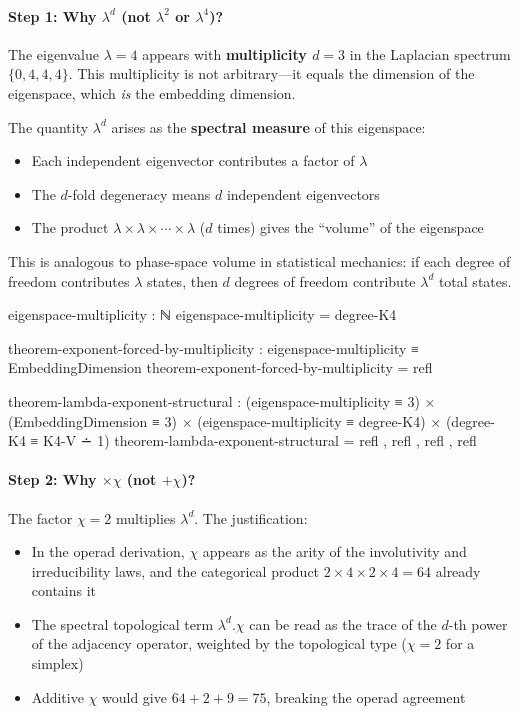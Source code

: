 \documentclass[11pt,a4paper]{book}
\def\cdot{.}%
\begin{document}
\paragraph{Step 1: Why $\lambda^d$ (not $\lambda^2$ or $\lambda^4$)?}

The eigenvalue $\lambda = 4$ appears with \textbf{multiplicity $d = 3$} in the 
Laplacian spectrum $\{0, 4, 4, 4\}$. This multiplicity is not arbitrary---it 
equals the dimension of the eigenspace, which \emph{is} the embedding dimension.

The quantity $\lambda^d$ arises as the \textbf{spectral measure} of this eigenspace:
\begin{itemize}
\item Each independent eigenvector contributes a factor of $\lambda$
\item The $d$-fold degeneracy means $d$ independent eigenvectors
\item The product $\lambda \times \lambda \times \cdots \times \lambda$ ($d$ times) 
      gives the ``volume'' of the eigenspace
\end{itemize}

This is analogous to phase-space volume in statistical mechanics: if each degree 
of freedom contributes $\lambda$ states, then $d$ degrees of freedom contribute 
$\lambda^d$ total states.

\begin{code}
eigenspace-multiplicity : ℕ
eigenspace-multiplicity = degree-K4

theorem-exponent-forced-by-multiplicity : eigenspace-multiplicity ≡ EmbeddingDimension
theorem-exponent-forced-by-multiplicity = refl

theorem-lambda-exponent-structural : 
  (eigenspace-multiplicity ≡ 3) × (EmbeddingDimension ≡ 3) ×
  (eigenspace-multiplicity ≡ degree-K4) × (degree-K4 ≡ K4-V ∸ 1)
theorem-lambda-exponent-structural = refl , refl , refl , refl
\end{code}

\paragraph{Step 2: Why $\times \chi$ (not $+ \chi$)?}

The factor $\chi = 2$ multiplies $\lambda^d$. The justification:
\begin{itemize}
\item In the operad derivation, $\chi$ appears as the arity of the involutivity
  and irreducibility laws, and the categorical product $2 \times 4 \times 2 \times 4 = 64$
  already contains it
\item The spectral topological term $\lambda^d \cdot \chi$ can be read as the
  trace of the $d$-th power of the adjacency operator, weighted by the topological
  type ($\chi = 2$ for a simplex)
\item Additive $\chi$ would give $64 + 2 + 9 = 75$, breaking the operad agreement
\end{itemize}
\end{document}
